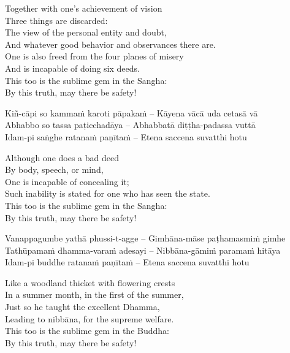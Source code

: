 \begin{english-verses}
  Together with one's achievement of vision\\
  Three things are discarded:\\
  The view of the personal entity and doubt,\\
  And whatever good behavior and observances there are.\\
  One is also freed from the four planes of misery\\
  And is incapable of doing six deeds.\\
  This too is the sublime gem in the Sangha:\\
  By this truth, may there be safety!
\end{english-verses}

Kiñ-cāpi so kammaṁ karoti pāpakaṁ – Kāyena vācā uda cetasā vā\\
Abhabbo so tassa paṭicchadāya – Abhabbatā diṭṭha-padassa vuttā\\
Idam-pi saṅghe ratanaṁ paṇītaṁ – Etena saccena suvatthi hotu

\begin{english-verses}
  Although one does a bad deed\\
  By body, speech, or mind,\\
  One is incapable of concealing it;\\
  Such inability is stated for one who has seen the state.\\
  This too is the sublime gem in the Sangha:\\
  By this truth, may there be safety!
\end{english-verses}

Vanappagumbe yathā phussi-t-agge – Gimhāna-māse paṭhamasmiṁ gimhe\\
Tathūpamaṁ dhamma-varaṁ adesayi – Nibbāna-gāmiṁ paramaṁ hitāya\\
Idam-pi buddhe ratanaṁ paṇītaṁ – Etena saccena suvatthi hotu

\begin{english-verses}
  Like a woodland thicket with flowering crests\\
  In a summer month, in the first of the summer,\\
  Just so he taught the excellent Dhamma,\\
  Leading to nibbāna, for the supreme welfare.\\
  This too is the sublime gem in the Buddha:\\
  By this truth, may there be safety!
\end{english-verses}

